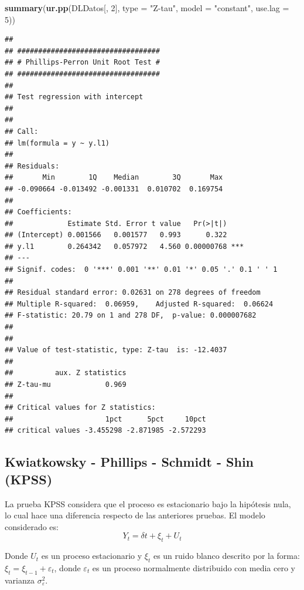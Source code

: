 \documentclass[
]{book}
\newenvironment{Shaded}{\begin{snugshade}}{\end{snugshade}}
\newcommand{\AttributeTok}[1]{\textcolor[rgb]{0.13,0.29,0.53}{#1}}
\newcommand{\DecValTok}[1]{\textcolor[rgb]{0.00,0.00,0.81}{#1}}
\newcommand{\FunctionTok}[1]{\textcolor[rgb]{0.13,0.29,0.53}{\textbf{#1}}}
\newcommand{\NormalTok}[1]{#1}
\newcommand{\StringTok}[1]{\textcolor[rgb]{0.31,0.60,0.02}{#1}}
\begin{document}
\begin{Shaded}
\begin{Highlighting}[]
\FunctionTok{summary}\NormalTok{(}\FunctionTok{ur.pp}\NormalTok{(DLDatos[, }\DecValTok{2}\NormalTok{], }\AttributeTok{type =} \StringTok{"Z{-}tau"}\NormalTok{, }\AttributeTok{model =} \StringTok{"constant"}\NormalTok{, }\AttributeTok{use.lag =} \DecValTok{5}\NormalTok{))}
\end{Highlighting}
\end{Shaded}

\begin{verbatim}
## 
## ################################## 
## # Phillips-Perron Unit Root Test # 
## ################################## 
## 
## Test regression with intercept 
## 
## 
## Call:
## lm(formula = y ~ y.l1)
## 
## Residuals:
##       Min        1Q    Median        3Q       Max 
## -0.090664 -0.013492 -0.001331  0.010702  0.169754 
## 
## Coefficients:
##             Estimate Std. Error t value   Pr(>|t|)    
## (Intercept) 0.001566   0.001577   0.993      0.322    
## y.l1        0.264342   0.057972   4.560 0.00000768 ***
## ---
## Signif. codes:  0 '***' 0.001 '**' 0.01 '*' 0.05 '.' 0.1 ' ' 1
## 
## Residual standard error: 0.02631 on 278 degrees of freedom
## Multiple R-squared:  0.06959,    Adjusted R-squared:  0.06624 
## F-statistic: 20.79 on 1 and 278 DF,  p-value: 0.000007682
## 
## 
## Value of test-statistic, type: Z-tau  is: -12.4037 
## 
##          aux. Z statistics
## Z-tau-mu             0.969
## 
## Critical values for Z statistics: 
##                      1pct      5pct     10pct
## critical values -3.455298 -2.871985 -2.572293
\end{verbatim}

\hypertarget{kwiatkowsky---phillips---schmidt---shin-kpss}{%
\subsection{Kwiatkowsky - Phillips - Schmidt - Shin (KPSS)}\label{kwiatkowsky---phillips---schmidt---shin-kpss}}

La prueba KPSS considera que el proceso es estacionario bajo la hipótesis nula, lo cual hace una diferencia respecto de las anteriores pruebas. El modelo considerado es:
\begin{equation}
    Y_t = \delta t + \xi_t + U_t
\end{equation}

Donde \(U_t\) es un proceso estacionario y \(\xi_t\) es un ruido blanco descrito por la forma: \(\xi_t = \xi_{t-1} + \varepsilon_t\), donde \(\varepsilon_t\) es un proceso normalmente distribuido con media cero y varianza \(\sigma^2_\varepsilon\).
\end{document}
